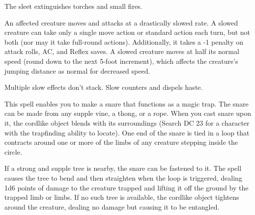 \begin{multicols}{2}
\begin{small}
\smallskip\noindent The sleet extinguishes torches and small fires.


\noindent An affected creature moves and attacks at a drastically slowed rate. A slowed creature can take only a single move action or standard action each turn, but not both (nor may it take full-round actions). Additionally, it takes a -1 penalty on attack rolls, AC, and Reflex saves. A slowed creature moves at half its normal speed (round down to the next 5-foot increment), which affects the creature's jumping distance as normal for decreased speed.

\smallskip\noindent Multiple slow effects don't stack. Slow counters and dispels haste.


\noindent This spell enables you to make a snare that functions as a magic trap. The snare can be made from any supple vine, a thong, or a rope. When you cast snare upon it, the cordlike object blends with its surroundings (Search DC 23 for a character with the trapfinding ability to locate). One end of the snare is tied in a loop that contracts around one or more of the limbs of any creature stepping inside the circle.

\smallskip\noindent If a strong and supple tree is nearby, the snare can be fastened to it. The spell causes the tree to bend and then straighten when the loop is triggered, dealing 1d6 points of damage to the creature trapped and lifting it off the ground by the trapped limb or limbs. If no such tree is available, the cordlike object tightens around the creature, dealing no damage but causing it to be entangled.


\end{small}
\end{multicols}
